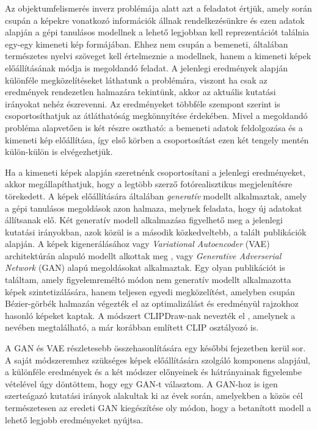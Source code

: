 Az objektumfelismerés inverz problémája alatt azt a feladatot értjük, amely során csupán a képekre vonatkozó információk állnak rendelkezésünkre és ezen adatok alapján a gépi tanulásos modellnek a lehető legjobban kell reprezentációt találnia egy-egy kimeneti kép formájában.
Ehhez nem csupán a bemeneti, általában természetes nyelvi szöveget kell értelmeznie a modellnek, hanem a kimeneti képek előállításának módja is megoldandó feladat.
A jelenlegi eredmények alapján különféle megközelítéseket láthatunk a problémára, viszont ha csak az eredmények rendezetlen halmazára tekintünk, akkor az aktuális kutatási irányokat nehéz észrevenni. Az eredményeket többféle szempont szerint is csoportosíthatjuk az átláthatóság megkönnyítése érdekében. Mivel a megoldandó probléma alapvetően is két részre osztható: a bemeneti adatok feldolgozása és a kimeneti kép előállítása, így első körben a csoportosítást ezen két tengely mentén külön-külön is elvégezhetjük.

Ha a kimeneti képek alapján szeretnénk csoportosítani a jelenlegi eredményeket, akkor megállapíthatjuk, hogy a legtöbb szerző fotórealisztikus megjelenítésre törekedett. A képek előállítására általában \textit{generatív} modellt alkalmaztak, amely a gépi tanulásos megoldások azon halmaza, melynek feladata, hogy új adatokat állítsanak elő. Két generatív modell alkalmazása figyelhető meg a jelenlegi kutatási irányokban, azok közül is a második közkedveltebb, a talált publikációk alapján.
A képek kigenerálásához vagy \textit{Variational Autoencoder} (VAE) architektúrán alapuló modellt alkottak meg \cite{ramesh2021zero}, vagy \textit{Generative Adverserial Network} (GAN) alapú megoldásokat \cite{dong2021unsupervised, reed2016learning, xu2018attngan, zhang2017stackgan} alkalmaztak.
Egy olyan publikációt is találtam, amely figyelemreméltó módon nem generatív modellt alkalmazotta képek szintetizálására, hanem teljesen egyedi megközelítést, amelyben csupán Bézier-görbék halmazán végezték el az optimalizálást és eredményül rajzokhoz hasonló képeket kaptak. A módszert CLIPDraw-nak nevezték el \cite{frans2021clipdraw}, amelynek a nevében megtalálható, a már korábban említett CLIP osztályozó is.

A GAN és VAE részletesebb összehasonlítására egy későbbi fejezetben kerül sor. A saját módszeremhez szükséges képek előállítására szolgáló komponens alapjául, a különféle eredmények és a két módszer előnyeinek és hátrányainak figyelembe vételével úgy döntöttem, hogy egy GAN-t választom.
A GAN-hoz is igen szerteágazó kutatási irányok alakultak ki az évek során, amelyekben a közös cél természetesen az eredeti GAN kiegészítése oly módon, hogy a betanított modell a lehető legjobb eredményeket nyújtsa.

